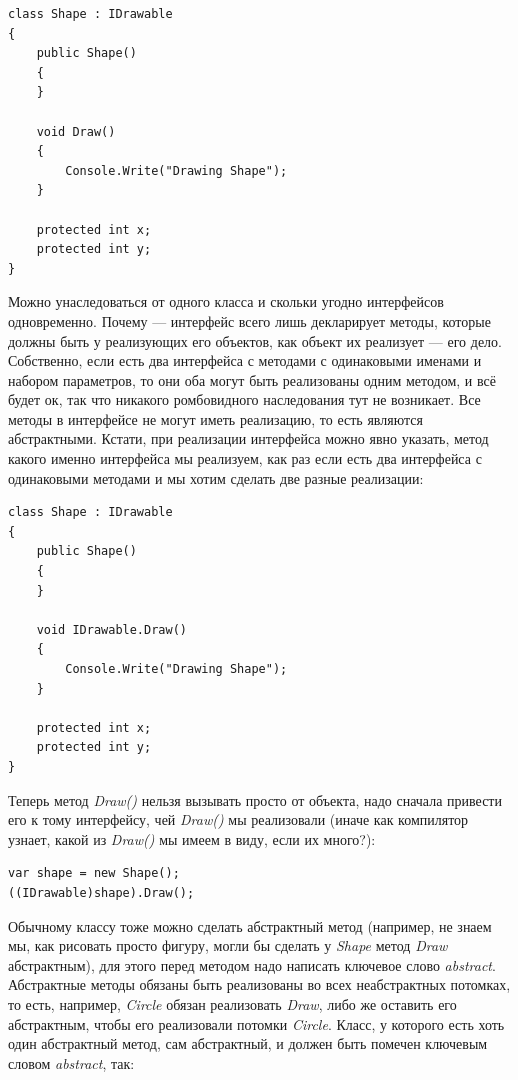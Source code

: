 \documentclass[a5paper]{article}
\begin{document}
\begin{verbatim}
class Shape : IDrawable
{
    public Shape() 
    { 
    }

    void Draw()
    {
        Console.Write("Drawing Shape");
    }

    protected int x;
    protected int y;
}
\end{verbatim}

Можно унаследоваться от одного класса и скольки угодно интерфейсов одновременно. Почему --- интерфейс всего лишь декларирует методы, которые должны быть у реализующих его объектов, как объект их реализует --- его дело. Собственно, если есть два интерфейса с методами с одинаковыми именами и набором параметров, то они оба могут быть реализованы одним методом, и всё будет ок, так что никакого ромбовидного наследования тут не возникает. Все методы в интерфейсе не могут иметь реализацию, то есть являются абстрактными. Кстати, при реализации интерфейса можно явно указать, метод какого именно интерфейса мы реализуем, как раз если есть два интерфейса с одинаковыми методами и мы хотим сделать две разные реализации:

\begin{verbatim}
class Shape : IDrawable
{
    public Shape() 
    { 
    }

    void IDrawable.Draw()
    {
        Console.Write("Drawing Shape");
    }

    protected int x;
    protected int y;
}
\end{verbatim}

Теперь метод \textit{Draw()} нельзя вызывать просто от объекта, надо сначала привести его к тому интерфейсу, чей \textit{Draw()} мы реализовали (иначе как компилятор узнает, какой из \textit{Draw()} мы имеем в виду, если их много?):

\begin{verbatim}
var shape = new Shape();
((IDrawable)shape).Draw();
\end{verbatim}

Обычному классу тоже можно сделать абстрактный метод (например, не знаем мы, как рисовать просто фигуру, могли бы сделать у \textit{Shape} метод \textit{Draw} абстрактным), для этого перед методом надо написать ключевое слово \textit{abstract}. Абстрактные методы обязаны быть реализованы во всех неабстрактных потомках, то есть, например, \textit{Circle} обязан реализовать \textit{Draw}, либо же оставить его абстрактным, чтобы его реализовали потомки \textit{Circle}. Класс, у которого есть хоть один абстрактный метод, сам абстрактный, и должен быть помечен ключевым словом \textit{abstract}, так:
\end{document}
